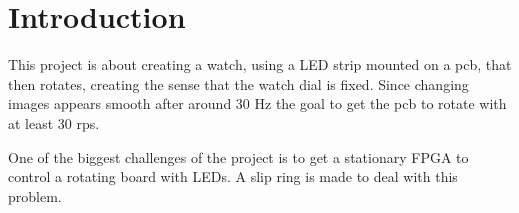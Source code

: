 \section{Introduction}
This project is about creating a watch, using a LED strip mounted on a pcb, that then rotates, creating the sense that the watch dial is fixed. 
Since changing images appears smooth after around 30 Hz \cite{article:rpm} the goal to get the pcb to rotate with at least 30 rps.

One of the biggest challenges of the project is to get a stationary FPGA to control a rotating board with LEDs.
A slip ring is made to deal with this problem.

